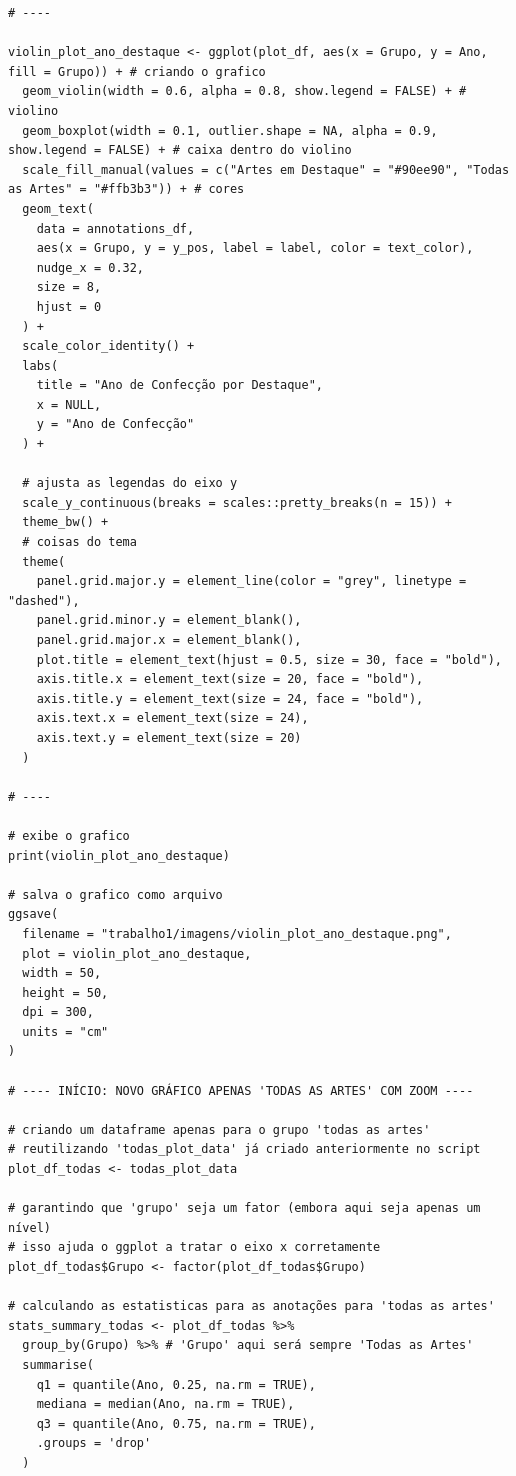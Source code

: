 \documentclass[11pt,a4paper]{article}
\begin{document}
\begin{verbatim}
# ----

violin_plot_ano_destaque <- ggplot(plot_df, aes(x = Grupo, y = Ano, fill = Grupo)) + # criando o grafico
  geom_violin(width = 0.6, alpha = 0.8, show.legend = FALSE) + # violino
  geom_boxplot(width = 0.1, outlier.shape = NA, alpha = 0.9, show.legend = FALSE) + # caixa dentro do violino
  scale_fill_manual(values = c("Artes em Destaque" = "#90ee90", "Todas as Artes" = "#ffb3b3")) + # cores
  geom_text(
    data = annotations_df,
    aes(x = Grupo, y = y_pos, label = label, color = text_color),
    nudge_x = 0.32,
    size = 8,
    hjust = 0
  ) +
  scale_color_identity() +
  labs(
    title = "Ano de Confecção por Destaque",
    x = NULL,
    y = "Ano de Confecção"
  ) +
  
  # ajusta as legendas do eixo y
  scale_y_continuous(breaks = scales::pretty_breaks(n = 15)) +
  theme_bw() + 
  # coisas do tema
  theme(
    panel.grid.major.y = element_line(color = "grey", linetype = "dashed"), 
    panel.grid.minor.y = element_blank(), 
    panel.grid.major.x = element_blank(),
    plot.title = element_text(hjust = 0.5, size = 30, face = "bold"), 
    axis.title.x = element_text(size = 20, face = "bold"),
    axis.title.y = element_text(size = 24, face = "bold"),
    axis.text.x = element_text(size = 24),
    axis.text.y = element_text(size = 20)
  )

# ----

# exibe o grafico
print(violin_plot_ano_destaque)

# salva o grafico como arquivo
ggsave(
  filename = "trabalho1/imagens/violin_plot_ano_destaque.png",
  plot = violin_plot_ano_destaque,
  width = 50,
  height = 50,
  dpi = 300,
  units = "cm"
) 

# ---- INÍCIO: NOVO GRÁFICO APENAS 'TODAS AS ARTES' COM ZOOM ----

# criando um dataframe apenas para o grupo 'todas as artes'
# reutilizando 'todas_plot_data' já criado anteriormente no script
plot_df_todas <- todas_plot_data

# garantindo que 'grupo' seja um fator (embora aqui seja apenas um nível)
# isso ajuda o ggplot a tratar o eixo x corretamente
plot_df_todas$Grupo <- factor(plot_df_todas$Grupo)

# calculando as estatisticas para as anotações para 'todas as artes'
stats_summary_todas <- plot_df_todas %>%
  group_by(Grupo) %>% # 'Grupo' aqui será sempre 'Todas as Artes'
  summarise(
    q1 = quantile(Ano, 0.25, na.rm = TRUE),
    mediana = median(Ano, na.rm = TRUE),
    q3 = quantile(Ano, 0.75, na.rm = TRUE),
    .groups = 'drop' 
  )


\end{verbatim}
\end{document}
